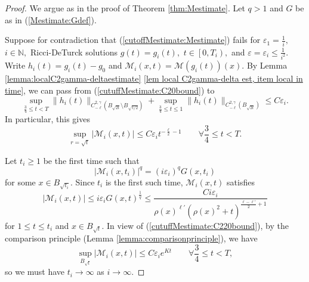 \documentclass[12pt]{amsart}
\newcommand{\calM}{\mathcal{M}}
\newcommand{\N}{{\mathbb N}}
\renewcommand{\1}{{\mathbf 1}}
\newcommand{\eps}{{\varepsilon}}
\theoremstyle{others}
\numberwithin{equation}{section}
\begin{document}
\begin{proof} We argue as in the proof of Theorem \ref{thm:Mestimate}. Let $q > 1$ and $G$ be as in (\ref{Mestimate:Gdef}).

    Suppose for contradiction that (\ref{cutoffMestimate:Mestimate}) fails for $\eps_1 = \frac{1}{i},$ $i \in \N,$ Ricci-DeTurck solutions $g(t) = g_i(t),$ $t \in \left[ 0, T_i \right),$ and $\eps = \eps_i \leq \frac{1}{i^2}.$ %
    Write $h_i(t) = g_i(t) - g_0$ and $\calM_i(x,t) = \calM(g_i(t))(x).$
    By Lemma \ref{lemma:localC2gamma-deltaestimate} \eqref{lem local C2gamma-delta est, item local in time}, we can pass from (\ref{cutuffMestimate:C20bound}) to 
    \begin{equation}\label{cutuffMestimate:C220bound}
       \sup_{\frac34 \le t < T} \| h_i(t)\|_{C^{2,\gamma}_{-\ell}\left( B_{\sqrt{2t}} \setminus B_{\sqrt{t/2} } \right) } 
       + \sup_{\frac34 \le t \le 1} \| h_i(t)\|_{C^{2,\gamma}_{-\ell}\left( B_{\sqrt{2t}}   \right) } 
       \leq C\eps_i.
    \end{equation}
    In particular, this gives
    \begin{equation}\label{cutoffMestimate:Mboundatparabolicscale}
         \sup_{r = \sqrt{t}} | \calM_i (x, t) | \leq C \eps_i t^{- \frac{\ell}{2} - 1}
        \qquad { \forall \frac34 \le t < T}.
 \end{equation}
    
    Let $t_i \ge 1$ be the first time such that
    \begin{equation}\label{cutoffMestimate:Mnonestimate}
        |\calM_i(x,t_i)|^q = (i \eps_i)^q G(x,t_i)
    \end{equation}
    for some $x \in B_{\sqrt{t_i}}.$ %
Since $t_i$ is the first such time, $\calM_i(x,t)$ satisfies
    \begin{equation}\label{cutoffMestimate:MiC2bound}
        | \calM_i(x,t) | \leq i \eps_i G(x,t)^{\frac{1}{q}} \leq \frac{C i \eps_i}{\rho(x)^{\ell' }(\rho(x)^2 + t)^{\frac{\ell - \ell'}{2} + 1} }
    \end{equation}
    for $1 \leq t \leq t_i$ and $x \in B_{\sqrt{t}}.$ In view of (\ref{cutuffMestimate:C220bound}), by the comparison principle (Lemma \ref{lemma:comparisonprinciple}), we have
    $$\sup_{B_{\sqrt{t}}}|\calM_i(x,t)| \leq C \eps_i e^{Kt} 
    \qquad { \forall \frac34 \le t < T},$$
    so we must have $t_i \to \infty$ as $i \to \infty.$
    

\end{proof}
\end{document}
